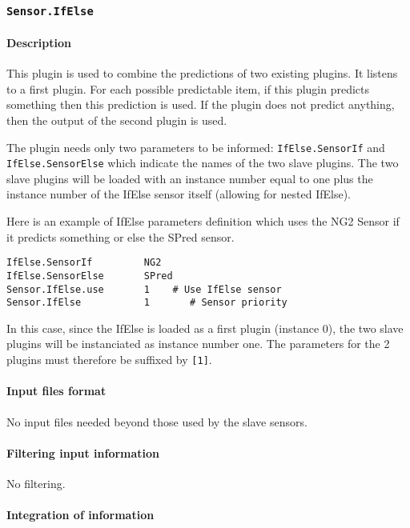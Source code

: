 
\subsubsection{\texttt{Sensor.IfElse}}

\paragraph{Description}

This plugin is used to combine the predictions of two existing
plugins. It listens to a first plugin. For each possible predictable
item, if this plugin predicts something then this prediction is used.
If the plugin does not predict anything, then the output of the second
plugin is used.
 
The plugin needs only two parameters to be informed:
\texttt{IfElse.SensorIf} and \texttt{IfElse.SensorElse} which indicate
the names of the two slave plugins. The two slave plugins will be
loaded with an instance number equal to one plus the instance number
of the IfElse sensor itself (allowing for nested IfElse).

Here is an example of IfElse parameters definition which uses the NG2
Sensor if it predicts something or else the SPred sensor.
\begin{Verbatim}[fontsize=\small]
IfElse.SensorIf         NG2
IfElse.SensorElse       SPred
Sensor.IfElse.use       1    # Use IfElse sensor
Sensor.IfElse           1       # Sensor priority
\end{Verbatim}

In this case, since the IfElse is loaded as a first plugin (instance
0), the two slave plugins will be instanciated as instance number
one. The parameters for the 2 plugins must therefore be suffixed by
\texttt{[1]}.

\paragraph{Input files format}

No input files  needed beyond those used by the slave sensors.

\paragraph{Filtering input information}

No filtering.

\paragraph{Integration of information}

